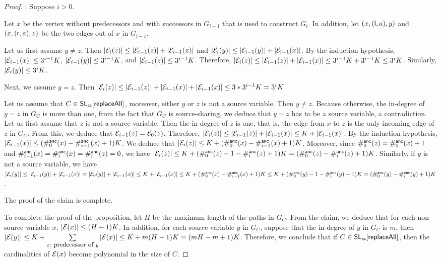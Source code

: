 \begin{proof}
\smallskip

:
Suppose $i > 0$.

Let $x$ be the vertex without predecessors and with successors in $G_{i-1}$ that is used to construct $G_{i}$. In addition, let $(x, (\mathsf{l}, a), y)$ and $(x, (\mathsf{r}, a), z)$ be the two edges out of $x$ in $G_{i-1}$.

Let us first assume $y \neq z$.
Then $|\mathcal{E}_{i}(z)| \le |\mathcal{E}_{i-1}(z)| + |\mathcal{E}_{i-1}(x)|$ and $|\mathcal{E}_{i}(y)| \le |\mathcal{E}_{i-1}(y)| + |\mathcal{E}_{i-1}(x)|$.  By the induction hypothesis, $|\mathcal{E}_{i-1}(x)| \le  3^{i-1} K$, $|\mathcal{E}_{i-1}(y)| \le 3^{i-1} K$, and $|\mathcal{E}_{i-1}(z)| \le 3^{i-1} K$. Therefore, $|\mathcal{E}_{i}(z)|  \le |\mathcal{E}_{i-1}(z)| + |\mathcal{E}_{i-1}(x)| \le 3^{i-1} K + 3^{i-1} K \le 3^i K$. Similarly, $|\mathcal{E}_{i}(y)| \le 3^i K$.

Next, we assume $y = z$. Then $|\mathcal{E}_{i}(z)| \le |\mathcal{E}_{i-1}(z)| + |\mathcal{E}_{i-1}(x)| + |\mathcal{E}_{i-1}(x)| \le 3* 3^{i-1} K = 3^i K$.

Let us assume that $C \in \mathsf{SL}_{\sf ss}[\mathsf{replaceAll}]$, moreover, either $y$ or $z$ is not a source variable. Then $y \neq z$. Because otherwise, the in-degree of $y=z$ in $G_C$ is more than one, from the fact that $G_C$ is source-sharing, we deduce that $y=z$ has to be a source variable, a contradiction. Let us first assume that $z$ is not a source variable. Then the in-degree of $z$ is one, that is, the edge from $x$ to $z$ is the only incoming edge of $z$ in $G_C$. From this, we deduce that  $\mathcal{E}_{i-1}(z) = \mathcal{E}_0(z)$. Therefore, $|\mathcal{E}_{i}(z)| \le |\mathcal{E}_{i-1}(z)| + |\mathcal{E}_{i-1}(x)| \le K + |\mathcal{E}_{i-1}(x)|$. By the induction hypothesis, $|\mathcal{E}_{i-1}(x)| \le (\#^{\sf anc}_{0}(x) - \#^{\sf anc}_{i-1}(x)+1)K$. We deduce that $|\mathcal{E}_{i}(z)| \le K+ (\#^{\sf anc}_{0}(x) - \#^{\sf anc}_{i-1}(x)+1)K$. Moreover, since $\#^{\sf anc}_{0}(z) = \#^{\sf anc}_{0}(x)+1$ and $\#^{\sf anc}_{i-1}(x)=\#^{\sf anc}_{i}(x)= \#^{\sf anc}_{i}(z)=0$, we have $|\mathcal{E}_{i}(z)| \le K+ (\#^{\sf anc}_{0}(z)-1 - \#^{\sf anc}_{i}(z)+1)K = (\#^{\sf anc}_{0}(z) - \#^{\sf anc}_{i}(z)+1)K$.
Similarly, if $y$ is not a source variable, we have $|\mathcal{E}_{i}(y)| \le |\mathcal{E}_{i-1}(y)| + |\mathcal{E}_{i-1}(x)| = |\mathcal{E}_{0}(y)| + |\mathcal{E}_{i-1}(x)| \le K+|\mathcal{E}_{i-1}(x)| \le K+ (\#^{\sf anc}_{0}(x) - \#^{\sf anc}_{i-1}(x)+1)K \le K+ (\#^{\sf anc}_{0}(y)-1 - \#^{\sf anc}_{i}(y)+1)K = (\#^{\sf anc}_{0}(y) - \#^{\sf anc}_{i}(y)+1)K$.

The proof of the claim is complete.

To complete the proof of the proposition, let $H$ be the maximum length of the paths in $G_C$. From the claim, we deduce that for each non-source variable $x$, $|\mathcal{E}(x)| \le (H-1)K$. In addition, for each source variable $y$ in $G_C$, suppose that the in-degree of $y$ in $G_C$ is $m$, then $|\mathcal{E}(y)| \le K + \sum \limits_{x: \mbox{ \small predecessor of } y} |\mathcal{E}(x)| \le  K+m(H-1)K=(mH-m+1) K$.
%
Therefore, we conclude that if $C \in \mathsf{SL}_{\sf ss}[\mathsf{replaceAll}]$, then the cardinalities of $\mathcal{E}(x)$ become polynomial in the size of $C$.
\end{proof}

